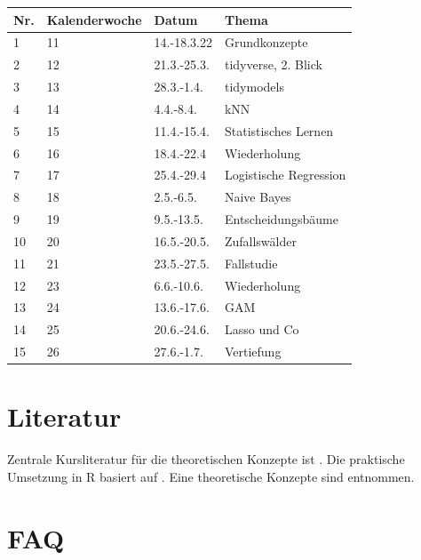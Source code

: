 \documentclass[
]{book}
\begin{document}
\begin{longtable}[]{@{}llll@{}}
\toprule
Nr. & Kalenderwoche & Datum & Thema \\
\midrule
\endhead
1 & 11 & 14.-18.3.22 & Grundkonzepte \\
2 & 12 & 21.3.-25.3. & tidyverse, 2. Blick \\
3 & 13 & 28.3.-1.4. & tidymodels \\
4 & 14 & 4.4.-8.4. & kNN \\
5 & 15 & 11.4.-15.4. & Statistisches Lernen \\
6 & 16 & 18.4.-22.4 & Wiederholung \\
7 & 17 & 25.4.-29.4 & Logistische Regression \\
8 & 18 & 2.5.-6.5. & Naive Bayes \\
9 & 19 & 9.5.-13.5. & Entscheidungsbäume \\
10 & 20 & 16.5.-20.5. & Zufallswälder \\
11 & 21 & 23.5.-27.5. & Fallstudie \\
12 & 23 & 6.6.-10.6. & Wiederholung \\
13 & 24 & 13.6.-17.6. & GAM \\
14 & 25 & 20.6.-24.6. & Lasso und Co \\
15 & 26 & 27.6.-1.7. & Vertiefung \\
\bottomrule
\end{longtable}

\hypertarget{literatur}{%
\section{Literatur}\label{literatur}}

Zentrale Kursliteratur für die theoretischen Konzepte ist \citep{rhys}.
Die praktische Umsetzung in R basiert auf \citep{silge_tidy_2022}. Eine theoretische Konzepte sind \citet{james_introduction_2021} entnommen.

\hypertarget{faq}{%
\section{FAQ}\label{faq}}
\end{document}
